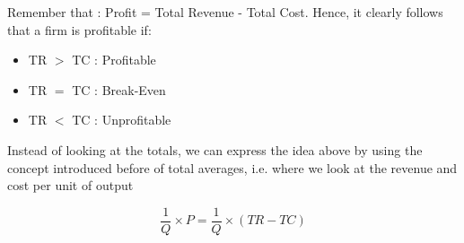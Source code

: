 \documentclass[english,course,draft]{Notes}
\begin{document}
\par{Remember that  : Profit = Total Revenue - Total Cost. Hence, it clearly follows that a firm is profitable if:}

\begin{itemize}
	\item TR $>$ TC : Profitable
	\item TR $=$ TC : Break-Even
	\item TR $<$ TC : Unprofitable
\end{itemize}

\par{Instead of looking at the totals, we can express the idea above by using the concept introduced before of total averages, i.e. where we look at the revenue and cost per unit of output}

$$\frac{1}{Q} \times P = \frac{1}{Q} \times (TR - TC)$$
\end{document}
